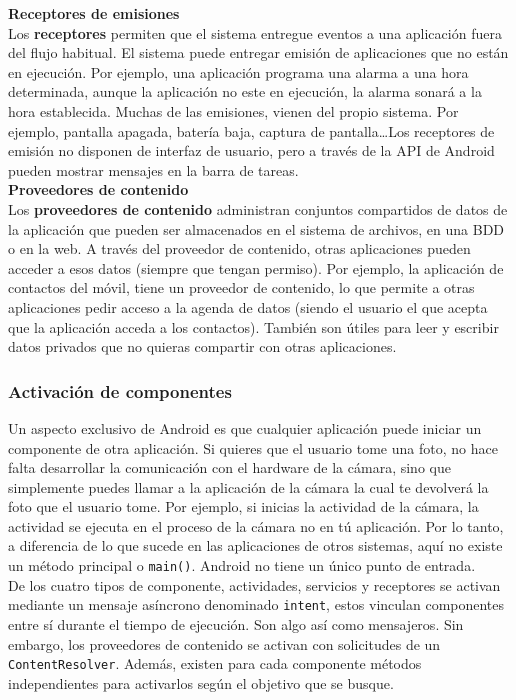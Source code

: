 \textbf{Receptores de emisiones} \\
Los \textbf{receptores} permiten que el sistema entregue eventos a una aplicación fuera del flujo habitual. El sistema puede entregar emisión de aplicaciones que no están en ejecución. Por ejemplo, una aplicación programa una alarma a una hora determinada, aunque la aplicación no este en ejecución, la alarma sonará a la hora establecida. Muchas de las emisiones, vienen del propio sistema. Por ejemplo, pantalla apagada, batería baja, captura de pantalla\dots Los receptores de emisión no disponen de interfaz de usuario, pero a través de la API de Android pueden mostrar mensajes en la barra de tareas. \\

\textbf{Proveedores de contenido} \\
Los \textbf{proveedores de contenido} administran conjuntos compartidos de datos de la aplicación que pueden ser almacenados en el sistema de archivos, en una BDD o en la web. A través del proveedor de contenido, otras aplicaciones pueden acceder a esos datos (siempre que tengan permiso). Por ejemplo, la aplicación de contactos del móvil, tiene un proveedor de contenido, lo que permite a otras aplicaciones pedir acceso a la agenda de datos (siendo el usuario el que acepta que la aplicación acceda a los contactos). También son útiles para leer y escribir datos privados que no quieras compartir con otras aplicaciones.

\subsubsection{Activación de componentes}

Un aspecto exclusivo de Android es que cualquier aplicación puede iniciar un componente de otra aplicación. Si quieres que el usuario tome una foto, no hace falta desarrollar la comunicación con el hardware de la cámara, sino que simplemente puedes llamar a la aplicación de la cámara la cual te devolverá la foto que el usuario tome. Por ejemplo, si inicias la actividad de la cámara, la actividad se ejecuta en el proceso de la cámara no en tú aplicación. Por lo tanto, a diferencia de lo que sucede en las aplicaciones de otros sistemas, aquí no existe un método principal o \verb|main()|. Android no tiene un único punto de entrada. \\

De los cuatro tipos de componente, actividades, servicios y receptores se activan mediante un mensaje asíncrono denominado \verb |intent|, estos vinculan componentes entre sí durante el tiempo de ejecución. Son algo así como mensajeros. Sin embargo, los proveedores de contenido se activan con solicitudes de un \verb|ContentResolver|. Además, existen para cada componente métodos independientes para activarlos según el objetivo que se busque.
